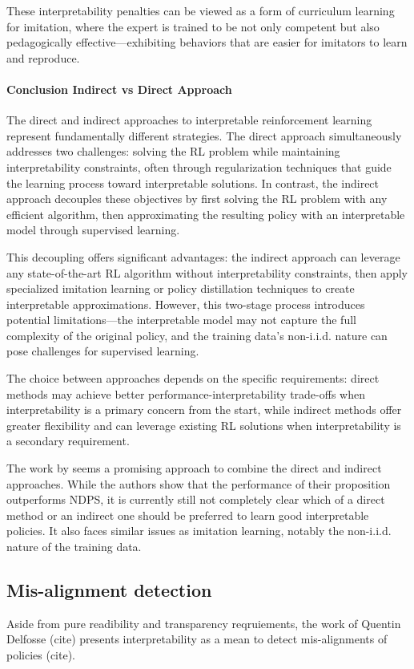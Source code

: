These interpretability penalties can be viewed as a form of curriculum learning for imitation, where the expert is trained to be not only competent but also pedagogically effective---exhibiting behaviors that are easier for imitators to learn and reproduce.

\paragraph{Conclusion Indirect vs Direct Approach}

The direct and indirect approaches to interpretable reinforcement learning represent fundamentally different strategies. The direct approach simultaneously addresses two challenges: solving the RL problem while maintaining interpretability constraints, often through regularization techniques that guide the learning process toward interpretable solutions. In contrast, the indirect approach decouples these objectives by first solving the RL problem with any efficient algorithm, then approximating the resulting policy with an interpretable model through supervised learning.

This decoupling offers significant advantages: the indirect approach can leverage any state-of-the-art RL algorithm without interpretability constraints, then apply specialized imitation learning or policy distillation techniques to create interpretable approximations. However, this two-stage process introduces potential limitations—the interpretable model may not capture the full complexity of the original policy, and the training data's non-i.i.d. nature can pose challenges for supervised learning.

The choice between approaches depends on the specific requirements: direct methods may achieve better performance-interpretability trade-offs when interpretability is a primary concern from the start, while indirect methods offer greater flexibility and can leverage existing RL solutions when interpretability is a secondary requirement.

The work by \citet{verma_imitation-projected_2019} seems a promising approach to combine the direct and indirect approaches.
While the authors show that the performance of their proposition outperforms NDPS, it is currently still not completely clear which of a direct method or an indirect one should be preferred to learn good interpretable policies.
It also faces similar issues as imitation learning, notably the non-i.i.d. nature of the training data.


\subsection{Mis-alignment detection}
Aside from pure readibility and transparency reqruiements, the work of Quentin Delfosse (cite) presents interpretability as a mean to detect mis-alignments of policies (cite).

